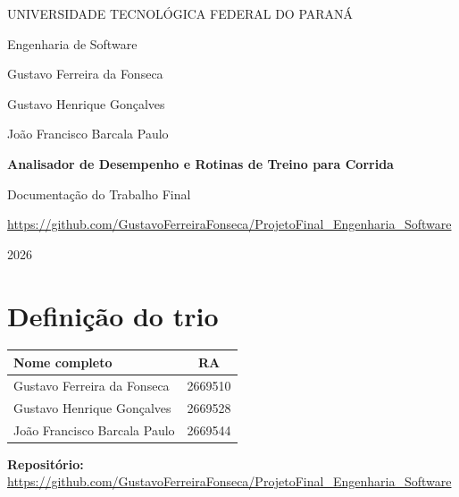 \documentclass[12pt,a4paper]{article}
\newcommand{\repositorio}{https://github.com/GustavoFerreiraFonseca/ProjetoFinal_Engenharia_Software}
\begin{document}
\begin{titlepage}
  \centering
  {\large UNIVERSIDADE TECNOLÓGICA FEDERAL DO PARANÁ\par}
  \vspace{0.3cm}
  {\large Engenharia de Software\par}

  \vspace{2.5cm}
  {\normalsize Gustavo Ferreira da Fonseca\par}
  {\normalsize Gustavo Henrique Gonçalves\par}
  {\normalsize João Francisco Barcala Paulo\par}

  \vfill
  {\LARGE\bfseries Analisador de Desempenho e Rotinas de Treino para Corrida\par}
  \vspace{0.8cm}
  {\large Documentação do Trabalho Final\par}
  \vspace{0.6cm}
  {\small\url{\repositorio}\par}
  \vfill

  {\normalsize 2026\par}
\end{titlepage}

\tableofcontents
\newpage

\section{Definição do trio}

\begin{table}[H]
  \centering
  \begin{tabular}{lc}
    \toprule
    \textbf{Nome completo} & \textbf{RA} \\
    \midrule
    Gustavo Ferreira da Fonseca  & 2669510 \\
    Gustavo Henrique Gonçalves   & 2669528 \\
    João Francisco Barcala Paulo & 2669544\\
    \bottomrule
  \end{tabular}
\end{table}

\noindent\textbf{Repositório:}\\
{\small\url{\repositorio}}
\end{document}
